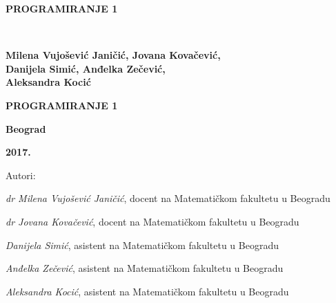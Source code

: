 \pagestyle{empty}

\vspace*{20pt}
\centerline{{\large\bfseries PROGRAMIRANJE 1} \vspace*{2mm}}
\newpage
\verb" "
\newpage
\begin{center}
{\sffamily


\vspace*{1cm}

{\fontsize{16pt}{19pt}\selectfont \bfseries  Milena Vujošević Janičić, Jovana Kovačević,\\ 
Danijela Simić, Anđelka Zečević, \\
Aleksandra Kocić}

\vspace{50pt}
\centerline{{\huge\bfseries PROGRAMIRANJE 1} \vspace*{2mm}}
\centerline{{\huge\bfseries {\fontsize{22pt}{26pt}\selectfont {Zbirka zadataka }}}}


\vspace{8cm}

\centerline{{\Large \bfseries Beograd}}
\centerline{{\Large \bfseries 2017.}}

}
\end{center}



\newpage


\small

\noindent
Autori: 

\noindent
{\slshape dr Milena Vujošević Janičić}, docent na Matematičkom fakultetu u Beogradu

\noindent
{\slshape dr Jovana Kovačević}, docent na Matematičkom fakultetu u Beogradu

\noindent
{\slshape Danijela Simić}, asistent na Matematičkom fakultetu u Beogradu

\noindent
{\slshape Anđelka Zečević}, asistent na Matematičkom fakultetu u Beogradu

\noindent
{\slshape Aleksandra Kocić}, asistent na Matematičkom fakultetu u Beogradu

